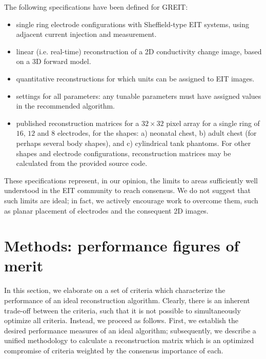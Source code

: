 \documentclass[12pt]{iopart}
\begin{document}
The following specifications have been defined for GREIT:
\begin{itemize}
\item
 single ring electrode
configurations with Sheffield-type EIT systems, using
      adjacent current injection and measurement.
\item
 linear (i.e. real-time) reconstruction of a 2D conductivity
change image, based on a 3D forward model.
\item
 quantitative reconstructions for which units can
  be assigned to EIT images.
\item
 settings for all parameters:
     any tunable parameters must have assigned
     values in the recommended algorithm.
\item
 published reconstruction matrices for
      a $32\times 32$ pixel array
      for a single ring of $16$, $12$ and $8$ 
      electrodes, for the shapes:
   a) neonatal chest, 
   b) adult chest (for perhaps several body shapes), and 
   c) cylindrical tank phantoms.
 For other shapes and electrode configurations,
   reconstruction matrices may be calculated from the
   provided source code.
\end{itemize}

These specifications represent, in our opinion, the limits
to areas sufficiently well understood in the EIT community
to reach consensus. We do not suggest that such limits are ideal;
in fact, we actively encourage work to overcome them,
such as planar placement of electrodes and the consequent 2D images. 

\section{Methods: performance figures of merit}
\label{sec:figmerit}

In this section, we elaborate on a set of criteria which 
characterize the performance of an ideal reconstruction
algorithm. Clearly, there is an inherent trade-off between
the criteria, such that it is not possible to 
simultaneously optimize all criteria. Instead, we proceed
as follows. First, we establish the desired performance measures
of an ideal algorithm; subsequently, 
we describe a unified methodology to calculate a reconstruction
matrix which is an optimized compromise of criteria
weighted by the consensus importance of each.  
\end{document}
